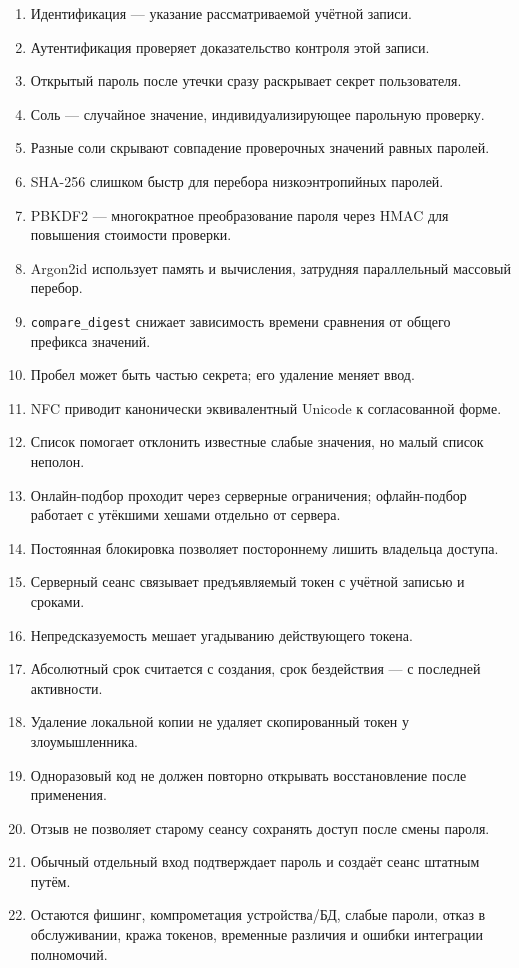 \documentclass[12pt,a4paper]{article}
\begin{document}
\begin{enumerate}
\item Идентификация — указание рассматриваемой учётной записи.
\item Аутентификация проверяет доказательство контроля этой записи.
\item Открытый пароль после утечки сразу раскрывает секрет пользователя.
\item Соль — случайное значение, индивидуализирующее парольную проверку.
\item Разные соли скрывают совпадение проверочных значений равных паролей.
\item SHA-256 слишком быстр для перебора низкоэнтропийных паролей.
\item PBKDF2 — многократное преобразование пароля через HMAC для повышения стоимости проверки.
\item Argon2id использует память и вычисления, затрудняя параллельный массовый перебор.
\item \texttt{compare\_digest} снижает зависимость времени сравнения от общего префикса значений.
\item Пробел может быть частью секрета; его удаление меняет ввод.
\item NFC приводит канонически эквивалентный Unicode к согласованной форме.
\item Список помогает отклонить известные слабые значения, но малый список неполон.
\item Онлайн-подбор проходит через серверные ограничения; офлайн-подбор работает с утёкшими хешами отдельно от сервера.
\item Постоянная блокировка позволяет постороннему лишить владельца доступа.
\item Серверный сеанс связывает предъявляемый токен с учётной записью и сроками.
\item Непредсказуемость мешает угадыванию действующего токена.
\item Абсолютный срок считается с создания, срок бездействия — с последней активности.
\item Удаление локальной копии не удаляет скопированный токен у злоумышленника.
\item Одноразовый код не должен повторно открывать восстановление после применения.
\item Отзыв не позволяет старому сеансу сохранять доступ после смены пароля.
\item Обычный отдельный вход подтверждает пароль и создаёт сеанс штатным путём.
\item Остаются фишинг, компрометация устройства/БД, слабые пароли, отказ в обслуживании, кража токенов, временные различия и ошибки интеграции полномочий.
\end{enumerate}
\end{document}
